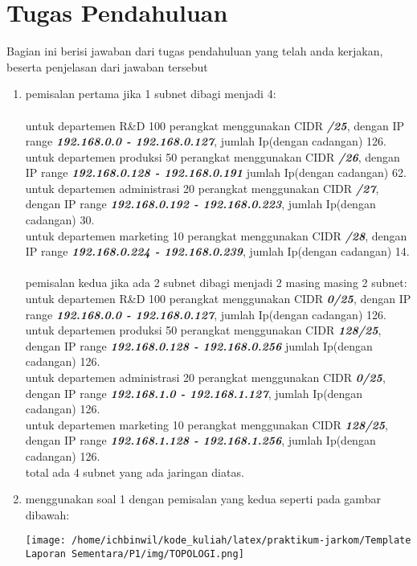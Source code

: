 \section{Tugas Pendahuluan}
Bagian ini berisi jawaban dari tugas pendahuluan yang telah anda kerjakan, beserta penjelasan dari jawaban tersebut
\begin{enumerate}
	\item pemisalan pertama jika 1 subnet dibagi menjadi 4:\\
	\\untuk departemen R&D 100 perangkat menggunakan CIDR \textbf{\textit{/25}}, dengan IP range \textbf{\textit{192.168.0.0 - 192.168.0.127}}, jumlah Ip(dengan cadangan) 126.\\
	untuk departemen produksi 50 perangkat menggunakan CIDR \textbf{\textit{/26}}, dengan IP range \textbf{\textit{192.168.0.128 - 192.168.0.191}} jumlah Ip(dengan cadangan) 62.\\
	untuk departemen administrasi 20 perangkat menggunakan CIDR \textbf{\textit{/27}}, dengan IP range \textbf{\textit{192.168.0.192 - 192.168.0.223}}, jumlah Ip(dengan cadangan) 30.\\
	untuk departemen marketing 10 perangkat menggunakan CIDR \textbf{\textit{/28}}, dengan IP range \textbf{\textit{192.168.0.224 - 192.168.0.239}}, jumlah Ip(dengan cadangan) 14. \\\\
	pemisalan kedua jika ada 2 subnet dibagi menjadi 2 masing masing 2 subnet:\\
	untuk departemen R&D 100 perangkat menggunakan CIDR \textbf{\textit{0/25}}, dengan IP range \textbf{\textit{192.168.0.0 - 192.168.0.127}}, jumlah Ip(dengan cadangan) 126.\\
	untuk departemen produksi 50 perangkat menggunakan CIDR \textbf{\textit{128/25}}, dengan IP range \textbf{\textit{192.168.0.128 - 192.168.0.256}} jumlah Ip(dengan cadangan) 126.\\
	untuk departemen administrasi 20 perangkat menggunakan CIDR \textbf{\textit{0/25}}, dengan IP range \textbf{\textit{192.168.1.0 - 192.168.1.127}}, jumlah Ip(dengan cadangan) 126.\\
	untuk departemen marketing 10 perangkat menggunakan CIDR \textbf{\textit{128/25}}, dengan IP range \textbf{\textit{192.168.1.128 - 192.168.1.256}}, jumlah Ip(dengan cadangan) 126. \\
	total ada 4 subnet yang ada jaringan diatas.
	\item menggunakan soal 1 dengan pemisalan yang kedua seperti pada gambar dibawah:\\
	\begin{center}
		\texttt{[image: /home/ichbinwil/kode\_kuliah/latex/praktikum-jarkom/Template Laporan Sementara/P1/img/TOPOLOGI.png]}
	\end{center}
	

\end{enumerate}

